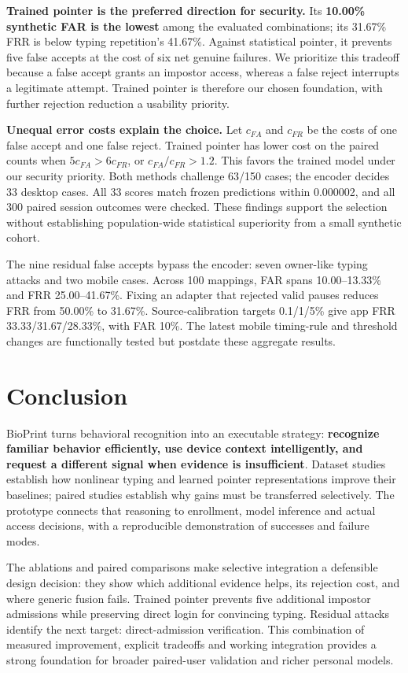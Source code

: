 \documentclass[10pt,a4paper]{article}
\begin{document}
\textbf{Trained pointer is the preferred direction for security.} Its \textbf{10.00\% synthetic FAR is the lowest} among the evaluated combinations; its 31.67\% FRR is below typing repetition's 41.67\%. Against statistical pointer, it prevents five false accepts at the cost of six net genuine failures. We prioritize this tradeoff because a false accept grants an impostor access, whereas a false reject interrupts a legitimate attempt. Trained pointer is therefore our chosen foundation, with further rejection reduction a usability priority.

\textbf{Unequal error costs explain the choice.} Let $c_{FA}$ and $c_{FR}$ be the costs of one false accept and one false reject. Trained pointer has lower cost on the paired counts when $5c_{FA}>6c_{FR}$, or $c_{FA}/c_{FR}>1.2$. This favors the trained model under our security priority. Both methods challenge 63/150 cases; the encoder decides 33 desktop cases. All 33 scores match frozen predictions within 0.000002, and all 300 paired session outcomes were checked. These findings support the selection without establishing population-wide statistical superiority from a small synthetic cohort.

The nine residual false accepts bypass the encoder: seven owner-like typing attacks and two mobile cases. Across 100 mappings, FAR spans 10.00--13.33\% and FRR 25.00--41.67\%. Fixing an adapter that rejected valid pauses reduces FRR from 50.00\% to 31.67\%. Source-calibration targets 0.1/1/5\% give app FRR 33.33/31.67/28.33\%, with FAR 10\%. The latest mobile timing-rule and threshold changes are functionally tested but postdate these aggregate results.

\section{Conclusion}
BioPrint turns behavioral recognition into an executable strategy: \textbf{recognize familiar behavior efficiently, use device context intelligently, and request a different signal when evidence is insufficient}. Dataset studies establish how nonlinear typing and learned pointer representations improve their baselines; paired studies establish why gains must be transferred selectively. The prototype connects that reasoning to enrollment, model inference and actual access decisions, with a reproducible demonstration of successes and failure modes.

The ablations and paired comparisons make selective integration a defensible design decision: they show which additional evidence helps, its rejection cost, and where generic fusion fails. Trained pointer prevents five additional impostor admissions while preserving direct login for convincing typing. Residual attacks identify the next target: direct-admission verification. This combination of measured improvement, explicit tradeoffs and working integration provides a strong foundation for broader paired-user validation and richer personal models.
\end{document}
